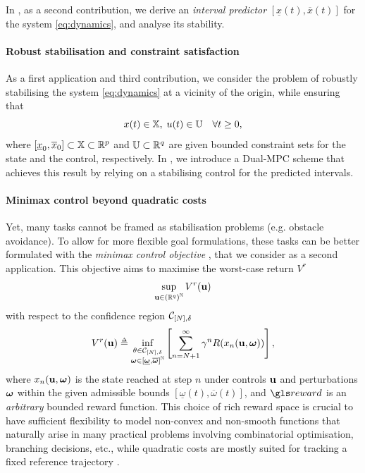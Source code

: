 In \textbf{}, as a second contribution, we derive an \emph{interval predictor} $[\underline{x}(t),\overline{x}(t)]$ for the system \eqref{eq:dynamics}, and analyse its stability.

\paragraph{Robust stabilisation and constraint satisfaction}

As a first application and third contribution, we consider the problem of robustly stabilising the system \eqref{eq:dynamics} at a vicinity of the origin, while ensuring that
\begin{equation*}
x(t)\in\mathbb{X},\;u(t)\in\mathbb{U}\quad\forall t\geq0,
\end{equation*}
where $[\underline{x}_{0},\overline{x}_{0}]\subset\mathbb{X}\subset\mathbb{R}^{p}$ and $\mathbb{U}\subset\mathbb{R}^{q}$ are given bounded constraint sets for the state and the control, respectively.
In \textbf{}, we introduce a Dual-\gls{MPC} scheme that achieves this result by relying on a stabilising control for the predicted intervals.

\paragraph{Minimax control beyond quadratic costs}
Yet, many tasks cannot be framed as stabilisation problems (e.g. obstacle avoidance). To allow for more flexible goal formulations, these tasks can be better formulated with the \emph{minimax control objective} \citep{Bental2009,Bertsimas2011,Gorissen2015}, that we consider as a second application. This objective aims to maximise the worst-case return $V^r$
\begin{equation}
\label{eq:robust-control}
\sup_{\mathbf{u}\in{(\mathbb{R}^q)}^{\mathbb{N}}} {V^r(\mathbf{u})}
\end{equation}
with respect to the confidence region $\mathcal{C}_{[N],\delta}$
\begin{equation}
\label{eq:robust-control-obj}
{V^r(\bu)} \eqdef \inf_{\substack{\theta \in \cC_{[N],\delta} \\ \bom\in[\underline{\bom},\overline{\bom}]^\Natural}} \left[\sum_{n=N+1}^\infty \gamma^n R(x_n(\bu,\bom))\right],
\end{equation}
where $x_n(\mathbf{u},\bm{\omega})$ is the state reached at step $n$ under controls $\mathbf{u}$ and perturbations $\bm{\omega}$ within the given admissible bounds $[\underline\omega(t),\overline\omega(t)]$, and $\R$ is an \emph{arbitrary} bounded reward function. This choice of rich reward space is crucial to have sufficient flexibility to model non-convex and non-smooth functions that naturally arise in many practical problems involving combinatorial optimisation, branching decisions, etc., while quadratic costs are mostly suited for tracking a fixed reference trajectory \citep[e.g.][]{Kumar2013}.

